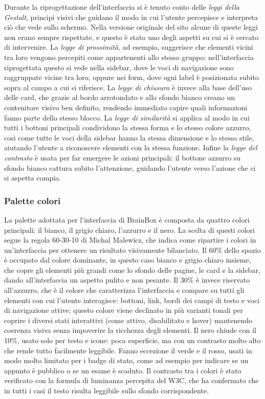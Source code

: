 Durante la riprogettazione dell'interfaccia si è tenuto conto delle \textit{leggi della Gestalt}, principi visivi che guidano il modo in cui l'utente percepisce e interpreta ciò che vede sullo schermo. Nella versione originale del sito alcune di queste leggi non erano sempre rispettate, e questo è stato uno degli aspetti su cui si è cercato di intervenire. La \textit{legge di prossimità}, ad esempio, suggerisce che elementi vicini tra loro vengono percepiti come appartenenti allo stesso gruppo: nell'interfaccia riprogettata questo si vede nella sidebar, dove le voci di navigazione sono raggruppate vicine tra loro, oppure nei form, dove ogni label è posizionata subito sopra al campo a cui si riferisce. La \textit{legge di chiusura} è invece alla base dell'uso delle card, che grazie al bordo arrotondato e allo sfondo bianco creano un contenitore visivo ben definito, rendendo immediato capire quali informazioni fanno parte dello stesso blocco. La \textit{legge di similarità} si applica al modo in cui tutti i bottoni principali condividono la stessa forma e lo stesso colore azzurro, così come tutte le voci della sidebar hanno la stessa dimensione e lo stesso stile, aiutando l'utente a riconoscere elementi con la stessa funzione. Infine la \textit{legge del contrasto} è usata per far emergere le azioni principali: il bottone azzurro su sfondo bianco cattura subito l'attenzione, guidando l'utente verso l'azione che ci si aspetta compia.

\subsubsection{Palette colori}
La palette adottata per l'interfaccia di BrainBox è composta da quattro colori principali: il bianco, il grigio chiaro, l'azzurro e il nero. La scelta di questi colori segue la regola 60-30-10 di Michal Malewicz, che indica come ripartire i colori in un'interfaccia per ottenere un risultato visivamente bilanciato. Il 60\% dello spazio è occupato dal colore dominante, in questo caso bianco e grigio chiaro insieme, che copre gli elementi più grandi come lo sfondo delle pagine, le card e la sidebar, dando all'interfaccia un aspetto pulito e non pesante. Il 30\% è invece riservato all'azzurro, che è il colore che caratterizza l'interfaccia e compare su tutti gli elementi con cui l'utente interagisce: bottoni, link, bordi dei campi di testo e voci di navigazione attive; questo colore viene declinato in più varianti tonali per coprire i diversi stati interattivi (come attivo, disabilitato e hover) mantenendo coerenza visiva senza impoverire la ricchezza degli elementi. Il nero chiude con il 10\%, usato solo per testo e icone: poca superficie, ma con un contrasto molto alto che rende tutto facilmente leggibile. Fanno eccezione il verde e il rosso, usati in modo molto limitato per i badge di stato, come ad esempio per indicare se un appunto è pubblico o se un esame è scaduto. Il contrasto tra i colori è stato verificato con la formula di luminanza percepita del W3C, che ha confermato che in tutti i casi il testo risulta leggibile sullo sfondo corrispondente.


